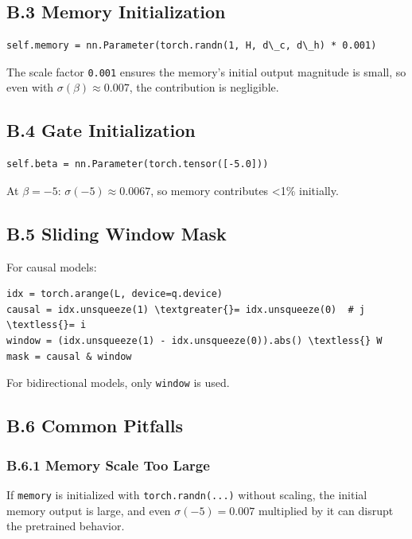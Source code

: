 \subsection{B.3 Memory Initialization}

\begin{lstlisting}
self.memory = nn.Parameter(torch.randn(1, H, d\_c, d\_h) * 0.001)
\end{lstlisting}

The scale factor \texttt{0.001} ensures the memory's initial output magnitude is 
small, so even with $\sigma(\beta) \approx 0.007$, the contribution is 
negligible.

\subsection{B.4 Gate Initialization}

\begin{lstlisting}
self.beta = nn.Parameter(torch.tensor([-5.0]))
\end{lstlisting}

At $\beta = -5$: $\sigma(-5) \approx 0.0067$, so memory contributes \textless{}1\% 
initially.

\subsection{B.5 Sliding Window Mask}

For causal models:

\begin{lstlisting}
idx = torch.arange(L, device=q.device)
causal = idx.unsqueeze(1) \textgreater{}= idx.unsqueeze(0)  # j \textless{}= i
window = (idx.unsqueeze(1) - idx.unsqueeze(0)).abs() \textless{} W
mask = causal & window
\end{lstlisting}

For bidirectional models, only \texttt{window} is used.

\subsection{B.6 Common Pitfalls}

\subsubsection{B.6.1 Memory Scale Too Large}

If \texttt{memory} is initialized with \texttt{torch.randn(...)} without scaling, the 
initial memory output is large, and even $\sigma(-5) = 0.007$ multiplied by 
it can disrupt the pretrained behavior.

